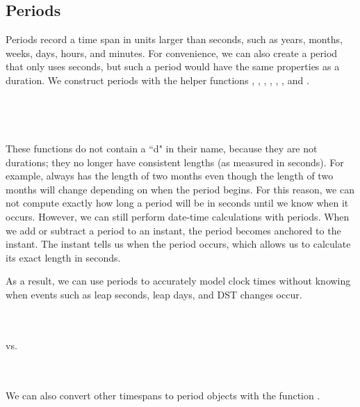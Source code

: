 \documentclass[article]{jss}
\begin{document}
\subsection{Periods}
\label{sec:periods}

Periods record a time span in units larger than seconds, such as years, months, weeks, days, hours, and minutes. For convenience, we can also create a period that only uses seconds, but such a period would have the same properties as a duration. We construct periods with the helper functions , , , , , , and  .\\

\\
\\

\\
\\

These functions do not contain a ``d" in their name, because they are not durations; they no longer have consistent lengths (as measured in seconds). For example,  always has the length of two months even though the length of two months will change depending on when the period begins. For this reason, we can not compute exactly how long a period will be in seconds until we know when it occurs. However, we can still perform date-time calculations with periods. When we add or subtract a period to an instant, the period becomes anchored to the instant. The instant tells us when the period occurs, which allows us to calculate its exact length in seconds. 

As a result, we can use periods to accurately model clock times without knowing when events such as leap seconds, leap days, and DST changes occur.

\\
\\

vs.

\\
\\

We can also convert other timespans to period objects with the function .\\
\end{document}
